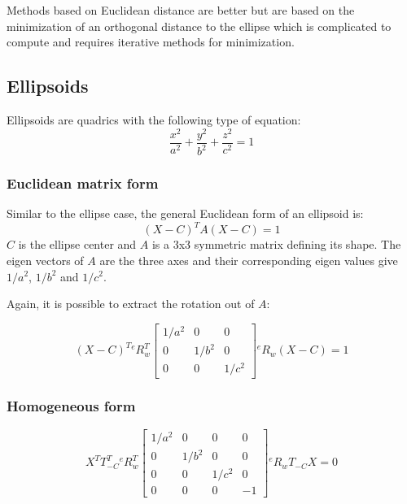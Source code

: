 Methods based on Euclidean distance are better but are based on the minimization of an orthogonal distance to the ellipse which is complicated to compute and requires iterative methods for minimization.



\subsection{Ellipsoids}

Ellipsoids are quadrics with the following type of equation:
\begin{equation}
    \frac{x^2}{a^2} + \frac{y^2}{b^2} + \frac{z^2}{c^2} = 1
\end{equation}


\subsubsection{Euclidean matrix form}
Similar to the ellipse case, the general Euclidean form of an ellipsoid is:
\begin{equation}
    (X - C)^T A (X - C) = 1
\end{equation}
$C$ is the ellipse center and $A$ is a 3x3 symmetric matrix defining its shape. The eigen vectors of $A$ are the three axes and their corresponding eigen values give $1/a^2$, $1/b^2$ and $1/c^2$.

Again, it is possible to extract the rotation out of $A$:

\begin{equation}
(X - C)^T {}^{e}R_{w}^T \left[ \begin{array}{ccc}
    1/a^2 & 0 & 0 \\
    0 & 1/b^2 & 0 \\
    0 & 0 & 1/c^2
\end{array}
\right] {}^{e}R_{w} (X - C) = 1
\end{equation}


\subsubsection{Homogeneous form}
\begin{equation}
    X^T T_{-C}^T
    {}^{e}R_{w}^T
    \left[ \begin{array}{cccc}
    1/a^2 & 0 & 0 & 0\\
    0 & 1/b^2 & 0 & 0\\
    0 & 0 & 1/c^2 & 0\\
    0 & 0 & 0 & -1
    \end{array}\right]
    {}^{e}R_{w}
    T_{-C}
    X = 0
\end{equation}

